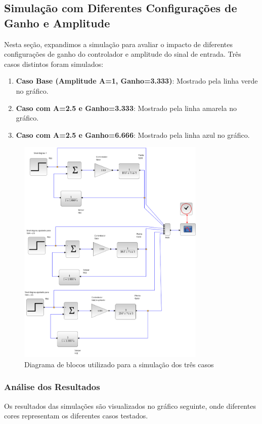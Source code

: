 \subsection{Simulação com Diferentes Configurações de Ganho e Amplitude}
Nesta seção, expandimos a simulação para avaliar o impacto de diferentes configurações de ganho do controlador e amplitude do sinal de entrada. Três casos distintos foram simulados:


\begin{enumerate}
    \item \textbf{Caso Base (Amplitude A=1, Ganho=3.333)}: Mostrado pela linha verde no gráfico.
    \item \textbf{Caso com A=2.5 e Ganho=3.333}: Mostrado pela linha amarela no gráfico.
    \item \textbf{Caso com A=2.5 e Ganho=6.666}: Mostrado pela linha azul no gráfico.
\end{enumerate}

\begin{figure}[H]
    \centering
    \includegraphics[width=0.8\textwidth]{5-atividade/assets/diagrama-c.png}
    \caption{Diagrama de blocos utilizado para a simulação dos três casos}
    \label{fig:diagrama_blocos_c}
\end{figure}

\subsubsection{Análise dos Resultados}
Os resultados das simulações são visualizados no gráfico seguinte, onde diferentes cores representam os diferentes casos testados.



